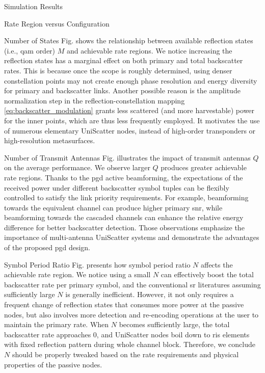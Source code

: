 \documentclass[journal]{IEEEtran}
\begin{document}
\begin{section}{Simulation Results}
\begin{subsection}{Rate Region versus Configuration}
		\begin{subsubsection}{Number of States}
			Fig.  shows the relationship between available reflection states (i.e., \gls{qam} order) $M$ and achievable rate regions.
			We notice increasing the reflection states has a marginal effect on both primary and total backscatter rates.
			This is because once the scope is roughly determined, using denser constellation points may not create enough phase resolution and energy diversity for primary and backscatter links.
			Another possible reason is the amplitude normalization step in the reflection-constellation mapping \eqref{eq:backscatter_modulation} grants less scattered (and more harvestable) power for the inner points, which are thus less frequently employed.
			It motivates the use of numerous elementary UniScatter nodes, instead of high-order transponders or high-resolution metasurfaces.
		\end{subsubsection}

		\begin{subsubsection}{Number of Transmit Antennas}
			Fig.  illustrates the impact of transmit antennas $Q$ on the average performance.
			We observe larger $Q$ produces greater achievable rate regions.
			Thanks to the \gls{pgd} active beamforming, the expectations of the received power under different backscatter symbol tuples can be flexibly controlled to satisfy the link priority requirements.
			For example, beamforming towards the equivalent channel can produce higher primary \gls{snr}, while beamforming towards the cascaded channels can enhance the relative energy difference for better backscatter detection.
			Those observations emphasize the importance of multi-antenna UniScatter systems and demonstrate the advantages of the proposed \gls{pgd} design.
		\end{subsubsection}

		\begin{subsubsection}{Symbol Period Ratio}
			Fig.  presents how symbol period ratio $N$ affects the achievable rate region.
			We notice using a small $N$ can effectively boost the total backscatter rate per primary symbol, and the conventional \gls{sr} literatures assuming sufficiently large $N$ is generally inefficient.
			However, it not only requires a frequent change of reflection states that consumes more power at the passive nodes, but also involves more detection and re-encoding operations at the user to maintain the primary rate.
			When $N$ becomes sufficiently large, the total backscatter rate approaches \num{0}, and UniScatter nodes boil down to \gls{ris} elements with fixed reflection pattern during whole channel block.
			Therefore, we conclude $N$ should be properly tweaked based on the rate requirements and physical properties of the passive nodes.
		\end{subsubsection}


\end{subsection}
\end{section}
\end{document}
